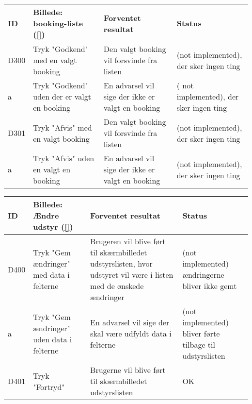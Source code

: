 \begin{longtable}{ |p{0.85cm}| p{7cm} | p{7.15cm} | p{1cm} | }
\hline
ID & Billede: booking-liste (\ref{})  & Forventet resultat & Status\\ 
\hline
D300 & Tryk "Godkend" med en valgt booking & Den valgt booking vil forsvinde fra listen & (not implemented), der sker ingen ting \\
\hline
a & Tryk "Godkend" uden der er valgt en booking & En advarsel vil sige der ikke er valgt en booking &( not implemented), der sker ingen ting \\
\hline
D301 & Tryk "Afvis" med en valgt booking & Den valgt booking vil forsvinde fra listen & (not implemented), der sker ingen ting \\
\hline
a & Tryk "Afvis" uden en valgt en booking & En advarsel vil sige der ikke er valgt en booking & (not implemented), der sker ingen ting \\
\hline
\end{longtable}

\begin{longtable}{ |p{0.85cm}| p{7cm} | p{7.15cm} | p{1cm} | }
\hline
ID & Billede: Ændre udstyr (\ref{}) & Forventet resultat & Status\\ 
\hline
D400 & Tryk "Gem ændringer" med data i felterne & Brugeren vil blive ført til skærmbilledet udstyrslisten, hvor udstyret vil være i listen med de ønskede ændringer &(not implemented) ændringerne bliver ikke gemt \\
\hline
a & Tryk "Gem ændringer" uden data i felterne & En advarsel vil sige der skal være udfyldt data i felterne &(not implemented) bliver førte tilbage til udstyrslisten \\
\hline
D401 & Tryk "Fortryd" & Brugerne vil blive ført til skærmbilledet udstyrslisten & OK \\
\hline
\end{longtable}

